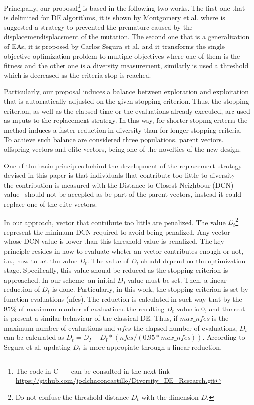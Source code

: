Principally, our proposal\footnote{The code in C++ can be consulted in the next link \url{https://github.com/joelchaconcastillo/Diversity\_DE\_Research.git} } is  based in the following two works.
%
The first one that is delimited for DE algorithms, it is shown by Montgomery et al. \cite{montgomery2012simple} where is suggested a strategy to prevented the premature caused by the displacemendisplacement of the mutation.
%
The second one that is a generalization of EAs, it is proposed by Carlos Segura et al. \cite{segura2016novel} and it transforms the single objective optimization problem to multiple objectives where one of them is the fitness and the other one is a diversity measurement, similarly is used a threshold which is decreased as the criteria stop is reached.
%

Particularly, our proposal induces a balance between exploration and exploitation that is automatically adjusted on the given stopping criterion.
%
Thus, the stopping criterion, as well as the elapsed time or the evaluations already executed, are used as inputs to the replacement strategy.
%
In this way, for shorter stoping criteria the method induces a faster reduction in diversity than for longer stopping criteria.
%
To achieve such balance are considered three populations, parent vectors, offspring vectors and elite vectors, being one of the novelties of the new design.
%

One of the basic principles behind the development of the replacement strategy devised in this paper is that individuals that contribute too little to diversity --the contribution is measured with the Distance to Closest Neighbour (DCN) value-- should not be accepted as be part of the parent vectors, instead it could replace one of the elite vectors.
%

In our approach, vector that contribute too little are penalized.
%
The value $D_t$\footnote{Do not confuse the threshold distance $D_t$ with the dimension $D$. } represent the minimum DCN required to avoid being penalized.
%
Any vector whose DCN value is lower than this threshold value is penalized.
%
The key principle resides in how to evaluate wheter an vector contributes enough or not, i.e., how to set the value $D_t$.
%
The value of $D_t$ should depend on the optimization stage.
%
Specifically, this value should be reduced as the stopping criterion is approached.
%
In our scheme, an initial $D_I$ value must be set.
%
Then, a linear reduction of $D_t$ is done.
%
Particularly, in this work, the stopping criterion is set by function evaluations (nfes).
%
The reduction is calculated in such way that by the $95\%$ of maximum number of evaluations the resulting $D_t$ value is $0$, and the rest is present a similar behaviour of the classical DE.
%
Thus, if $max\_nfes$ is the maximum number of evaluations and $nfes$ the elapsed number of evaluations, $D_t$ can be calculated as $D_t=D_I - D_I *(nfes/(0.95*max\_nfes))$.
%
According to Segura et al. \cite{segura2016novel} updating $D_t$ is more appropiate through a linear reduction.
%


